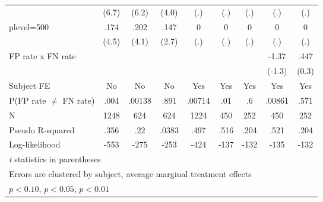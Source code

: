 \begin{table}[htbp]
\begin{tabular}{l*{8}{c}}
                &    (6.7)         &    (6.2)         &    (4.0)         &      (.)         &      (.)         &      (.)         &      (.)         &      (.)         \\
plevel=500      &     .174\sym{***}&     .202\sym{***}&     .147\sym{***}&        0         &        0         &        0         &        0         &        0         \\
                &    (4.5)         &    (4.1)         &    (2.7)         &      (.)         &      (.)         &      (.)         &      (.)         &      (.)         \\
FP rate x FN rate&                  &                  &                  &                  &                  &                  &    -1.37         &     .447         \\
                &                  &                  &                  &                  &                  &                  &   (-1.3)         &    (0.3)         \\
Subject FE      &       No         &       No         &       No         &      Yes         &      Yes         &      Yes         &      Yes         &      Yes         \\
\hline
P(FP rate $\neq$ FN rate)&     .004         &   .00138         &     .891         &   .00714         &      .01         &       .6         &   .00861         &     .571         \\
N               &     1248         &      624         &      624         &     1224         &      450         &      252         &      450         &      252         \\
Pseudo R-squared&     .356         &      .22         &    .0383         &     .497         &     .516         &     .204         &     .521         &     .204         \\
Log-likelihood  &     -553         &     -275         &     -253         &     -424         &     -137         &     -132         &     -135         &     -132         \\
\hline\hline
\multicolumn{9}{l}{\footnotesize \textit{t} statistics in parentheses}\\
\multicolumn{9}{l}{\footnotesize Errors are clustered by subject, average marginal treatment effects}\\
\multicolumn{9}{l}{\footnotesize \sym{*} \(p<0.10\), \sym{**} \(p<0.05\), \sym{***} \(p<0.01\)}\\
\end{tabular}
\end{table}
